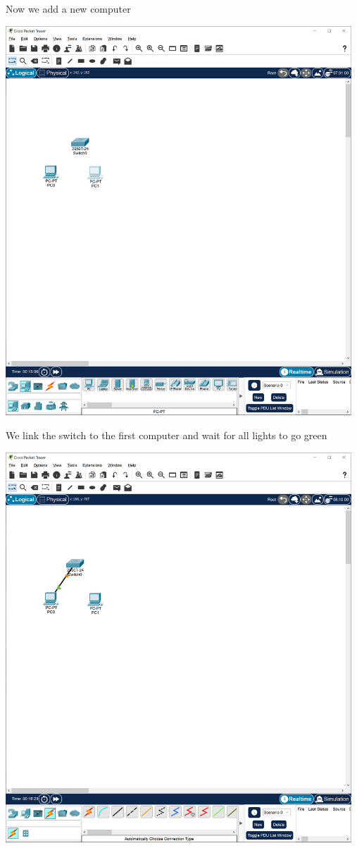 \documentclass[a4paper,12pt]{book}
\begin{document}
\noindent Now we add a new computer \newline

\noindent \includegraphics[width=13cm]{./step-by-step/7.PNG}
\clearpage


\noindent We link the switch to the first computer and wait for all lights to go green \newline

\noindent \includegraphics[width=13cm]{./step-by-step/8.PNG}
\clearpage
\end{document}
